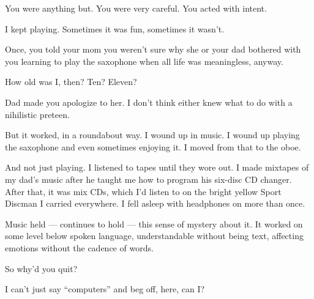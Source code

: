 \begin{paracol}{2}
\begin{leftcolumn}
\begin{ally}
You were anything but. You were very careful. You acted with intent.
\end{ally}
I kept playing. Sometimes it was fun, sometimes it wasn't.

\begin{ally}
Once, you told your mom you weren't sure why she or your dad bothered with you learning to play the saxophone when all life was meaningless, anyway.
\end{ally}
How old was I, then? Ten? Eleven?

\begin{ally}
Dad made you apologize to her. I don't think either knew what to do with a nihilistic preteen.
\end{ally}
But it worked, in a roundabout way. I wound up in music. I wound up playing the saxophone and even sometimes enjoying it. I moved from that to the oboe.

And not just playing. I listened to tapes until they wore out. I made mixtapes of my dad's music after he taught me how to program his six-disc CD changer. After that, it was mix CDs, which I'd listen to on the bright yellow Sport Discman I carried everywhere. I fell asleep with headphones on more than once.

Music held --- continues to hold --- this sense of mystery about it. It worked on some level below spoken language, understandable without being text, affecting emotions without the cadence of words.

\begin{ally}
So why'd you quit?
\end{ally}
I can't just say ``computers'' and beg off, here, can I?


\end{leftcolumn}
\end{paracol}
